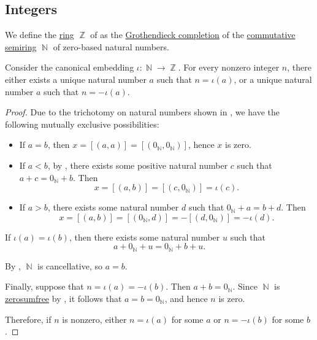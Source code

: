 \subsection{Integers}\label{subsec:integers}

\begin{definition}\label{def:integers}
  We define the \hyperref[def:ring]{ring} \( \BbbZ \) of  as the \hyperref[thm:grothendieck_semiring_completion]{Grothendieck completion} of the \hyperref[def:semiring/commutative]{commutative semiring} \hyperref[def:natural_numbers]{\( \BbbN \)} of zero-based natural numbers.
\end{definition}

\begin{lemma}\label{thm:integer_signum_lemma}
  Consider the canonical embedding \( \iota: \BbbN \to \BbbZ \). For every nonzero integer \( n \), there either exists a unique natural number \( a \) such that \( n = \iota(a) \), or a unique natural number \( a \) such that \( n = -\iota(a) \).
\end{lemma}
\begin{proof}
  \ExistenceSubProof Due to the trichotomy on natural numbers shown in , we have the following mutually exclusive possibilities:
  \begin{itemize}
    \item If \( a = b \), then \( x = [(a, a)] = [(0_\BbbN, 0_\BbbN)] \), hence \( x \) is zero.
    \item If \( a < b \), by , there exists some positive natural number \( c \) such that \( a + c = 0_\BbbN + b \). Then
    \begin{equation*}
      x = [(a, b)] = [(c, 0_\BbbN)] = \iota(c).
    \end{equation*}

    \item If \( a > b \), there exists some natural number \( d \) such that \( 0_\BbbN + a = b + d \). Then
    \begin{equation*}
      x = [(a, b)] = [(0_\BbbN, d)] = -[(d, 0_\BbbN)] = -\iota(d).
    \end{equation*}
  \end{itemize}

  \UniquenessSubProof If \( \iota(a) = \iota(b) \), then there exists some natural number \( u \) such that
  \begin{equation*}
     a + 0_\BbbN + u = 0_\BbbN + b + u.
  \end{equation*}

  By , \( \BbbN \) is cancellative, so \( a = b \).

   Finally, suppose that \( n = \iota(a) = -\iota(b) \). Then \( a + b = 0_\BbbN \). Since \( \BbbN \) is \hyperref[def:zerosumfree]{zerosumfree} by , it follows that \( a = b = 0_\BbbN \), and hence \( n \) is zero.

  Therefore, if \( n \) is nonzero, either \( n = \iota(a) \) for some \( a \) or \( n = -\iota(b) \) for some \( b \).
\end{proof}

